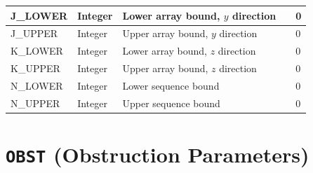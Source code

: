 \documentclass[11pt]{book}
\begin{document}
\begin{longtable}{@{\extracolsep{\fill}}|l|l|l|l|l|}
{\ct J\_LOWER}       & Integer          & Lower array bound, $y$ direction            &    & 0                          \\ \hline
{\ct J\_UPPER}       & Integer          & Upper array bound, $y$ direction            &    & 0                          \\ \hline
{\ct K\_LOWER}       & Integer          & Lower array bound, $z$ direction            &    & 0                          \\ \hline
{\ct K\_UPPER}       & Integer          & Upper array bound, $z$ direction            &    & 0                          \\ \hline
{\ct N\_LOWER}       & Integer          & Lower sequence bound                        &    & 0                          \\ \hline
{\ct N\_UPPER}       & Integer          & Upper sequence bound                        &    & 0                          \\ \hline
\end{longtable}


\vspace{\baselineskip}



\section{\texorpdfstring{{\tt OBST}}{OBST} (Obstruction Parameters)}
\end{document}
